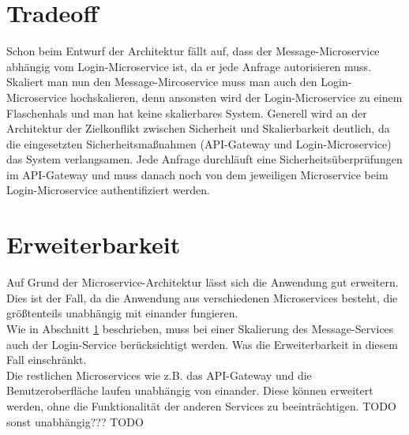 \section{Tradeoff}
\label{tradeoff}
Schon beim Entwurf der Architektur fällt auf, dass der Message-Microservice abhängig vom Login-Microservice ist, da er jede Anfrage autorisieren muss. Skaliert man nun den Message-Mircoservice muss man auch den Login-Microservice hochskalieren, denn ansonsten wird der Login-Microservice zu einem Flaschenhals und man hat keine skalierbares System. Generell wird an der Architektur der Zielkonflikt zwischen Sicherheit und Skalierbarkeit deutlich, da die eingesetzten Sicherheitsmaßnahmen (API-Gateway und Login-Microservice) das System verlangsamen. Jede Anfrage durchläuft eine Sicherheitsüberprüfungen im API-Gateway und muss danach noch von dem jeweiligen Microservice beim Login-Microservice authentifiziert werden.


\section{Erweiterbarkeit}
Auf Grund der Microservice-Architektur lässt sich die Anwendung gut erweitern. Dies ist der Fall, da die Anwendung aus verschiedenen Microservices besteht, die größtenteils unabhängig mit einander fungieren.\\
Wie in Abschnitt \ref{tradeoff} beschrieben, muss bei einer Skalierung des Message-Services auch der Login-Service berücksichtigt werden. Was die Erweiterbarkeit in diesem Fall einschränkt.\\
Die restlichen Microservices wie z.B. das API-Gateway und die Benutzeroberfläche laufen unabhängig von einander. Diese können erweitert werden, ohne die Funktionalität der anderen Services zu beeinträchtigen.
TODO sonst unabhängig??? TODO